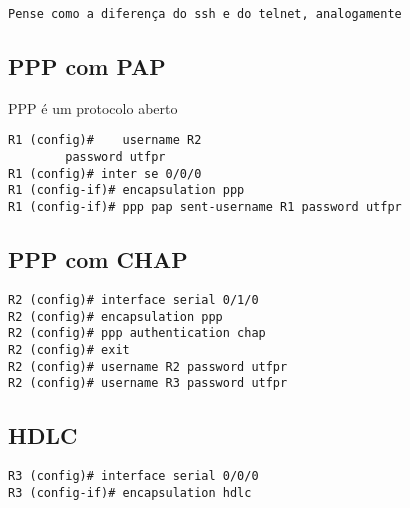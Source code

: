 \documentclass[]{article}
\begin{document}
\texttt{Pense\ como\ a\ diferença\ do\ ssh\ e\ do\ telnet,\ analogamente}

\subsection{PPP com PAP}\label{ppp-com-pap}

PPP é um protocolo aberto

\begin{verbatim}
R1 (config)#    username R2
        password utfpr
R1 (config)# inter se 0/0/0
R1 (config-if)# encapsulation ppp
R1 (config-if)# ppp pap sent-username R1 password utfpr
\end{verbatim}

\subsection{PPP com CHAP}\label{ppp-com-chap}

\begin{verbatim}
R2 (config)# interface serial 0/1/0
R2 (config)# encapsulation ppp
R2 (config)# ppp authentication chap
R2 (config)# exit
R2 (config)# username R2 password utfpr
R2 (config)# username R3 password utfpr
\end{verbatim}

\subsection{HDLC}\label{hdlc}

\begin{verbatim}
R3 (config)# interface serial 0/0/0
R3 (config-if)# encapsulation hdlc
\end{verbatim}
\end{document}
